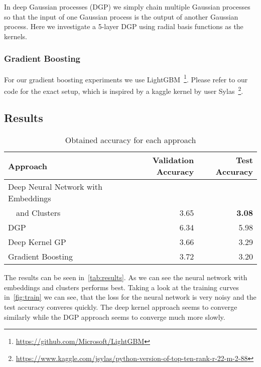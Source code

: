 In deep Gaussian processes (DGP) we simply chain multiple Gaussian processes so that
the input of one Gaussian process is the output of another Gaussian process.
Here we investigate a 5-layer DGP using radial basis functions as the kernels.

\subsubsection{Gradient Boosting}%
\label{ssub:gradient_boosting}

For our gradient boosting experiments we use
LightGBM~\footnote{\url{https://github.com/Microsoft/LightGBM}}. Please refer
to our code for the exact setup, which is inspired by a kaggle kernel by user
Sylas~\footnote{\url{https://www.kaggle.com/jsylas/python-version-of-top-ten-rank-r-22-m-2-88}}.

\subsection{Results}%
\label{sub:results}

\begin{table}[htb!]
    \centering
    \caption{Obtained accuracy for each approach}
    \label{tab:results}
    \begin{tabular}{lrr}
        \toprule
        Approach & Validation Accuracy & Test Accuracy \\
        \midrule
        Deep Neural Network with Embeddings && \\
        \ \ and Clusters & 3.65 & \textbf{3.08} \\
        DGP & 6.34 & 5.98 \\
        Deep Kernel GP & 3.66 & 3.29 \\
        Gradient Boosting & 3.72 & 3.20 \\
        \bottomrule
    \end{tabular}
\end{table}

The results can be seen in~\autoref{tab:results}. As we can see the neural
network with embeddings and clusters performs best. Taking a look at the
training curves in~\autoref{fig:train} we can see, that the loss for the neural
network is very noisy and the test accuracy converes quickly. The deep kernel
approach seems to converge similarly while the DGP approach seems to converge
much more slowly.


